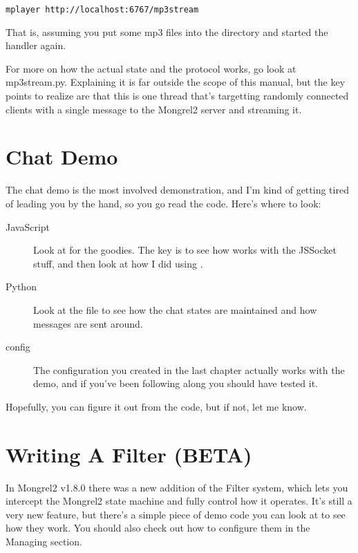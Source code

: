 \begin{Verbatim}
mplayer http://localhost:6767/mp3stream
\end{Verbatim}

That is, assuming you put some mp3 files into the directory and
started the handler again.

For more on how the actual state and the protocol works, go look
at mp3stream.py.  Explaining it is far outside the scope of this manual,
but the key points to realize are that this is one thread that's
targetting randomly connected clients with a single message to the
Mongrel2 server and streaming it.


\section{Chat Demo}

The chat demo is the most involved demonstration, and I'm kind of getting
tired of leading you by the hand, so you go read the code.  Here's where
to look:

\begin{description}
\item [JavaScript] Look at  for the goodies.
    The key is to see how  works with the JSSocket stuff,
    and then look at how I did  using .
\item [Python] Look at the  file to see how
    the chat states are maintained and how messages are sent around.
\item [config] The configuration you created in the last chapter
    actually works with the demo, and if you've been following along
    you should have tested it.
\end{description}

Hopefully, you can figure it out from the code, but if not, let me know.


\section{Writing A Filter (BETA)}

In Mongrel2 v1.8.0 there was a new addition of the Filter system, which
lets you intercept the Mongrel2 state machine and fully control how it 
operates.  It's still a very new feature, but there's a simple piece of
demo code you can look at to see how they work.  You should also check
out how to configure them in the Managing section.

